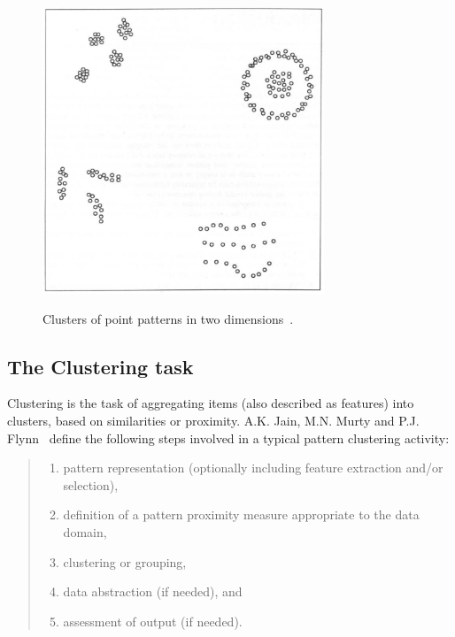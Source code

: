 \begin{figure}[h]
  \begin{center}
    \includegraphics[width=0.75\textwidth]{figures/clusters.png}
    \label{fig:clusters}
    \caption{Clusters of point patterns in two dimensions~\cite[p 2]{Jain99clusterreview}.}
  \end{center}
\end{figure}



\subsection{The Clustering task}

Clustering is the task of aggregating items (also described as features) into clusters, based on similarities or proximity. A.K. Jain, M.N. Murty and P.J. Flynn~\cite{Jain99clusterreview} define the following steps involved in a typical pattern clustering activity:
 
\begin{quote}
\begin{enumerate}
\item pattern representation (optionally including feature extraction and/or selection), 
\item definition of a pattern proximity measure appropriate to the data domain, 
\item clustering or grouping, 
\item data abstraction (if needed), and 
\item assessment of output (if needed). 
\end{enumerate}
\end{quote}



